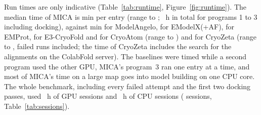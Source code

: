 Run times are only indicative (Table~\ref{tab:runtime}, Figure~\ref{fig:runtime}). The median time of MICA is \RtMedMica{} min per entry (range \RtMinMica{} to \RtMaxMica{}; \RtTotMica{}~h in total for programs 1 to 3 including docking), against \RtMedAngelo{} min for ModelAngelo, \RtMedEmodelx{} for EModelX(+AF), \RtMedEmprot{} for EMProt, \RtMedEthree{} for E3-CryoFold and \RtMedCryoatom{} for CryoAtom (range \RtMinCryoatom{} to \RtMaxCryoatom{}) and \RtMedCryozeta{} for CryoZeta (range \RtMinCryozeta{} to \RtMaxCryozeta{}, failed runs included; the time of CryoZeta includes the search for the alignments on the ColabFold server). The baselines were timed while a second program used the other GPU, MICA's program~3 ran one entry at a time, and most of MICA's time on a large map goes into model building on one CPU core. The whole benchmark, including every failed attempt and the first two docking passes, used \GpuSessionHours{}~h of GPU sessions and \CpuSessionHours{}~h of CPU sessions (\NSessions{} sessions, Table~\ref{tab:sessions}).
